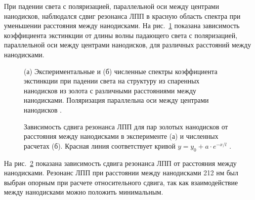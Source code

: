 При падении света с поляризацией, параллельной оси между центрами нанодисков, наблюдался сдвиг резонанса ЛПП в красную область спектра при уменьшении расстояния между нанодисками. На рис.~\ref{img:PR_extinction} показана зависимость коэффициента экстинкции от длины волны падающего света с поляризацией, параллельной оси между центрами нанодисков, для различных расстояний между нанодисками.
\begin{figure}[t]
\caption{(а) Экспериментальные и (б) численные спектры коэффициента экстинкции при падении света на структуру из спаренных нанодисков из золота с различными расстояниями между нанодисками. Поляризация параллельна оси между центрами нанодисков \cite{plasonrulereq}.}
\label{img:PR_extinction}
\end{figure}
\begin{figure}[t]
\caption{Зависимость сдвига резонанса ЛПП для пар золотых нанодисков от расстояния между нанодисками в эксперименте (а) и численных расчетах (б). Красная линия соответствует кривой $ y = y_0 + a \cdot e^{-x/l} $  \cite{plasonrulereq}.}
\label{img:PR_ruler}
\end{figure}

На рис.~\ref{img:PR_ruler} показана зависимость сдвига резонанса ЛПП от расстояния между нанодисками. Резонанс ЛПП при расстоянии между нанодисками 212 нм был выбран опорным при расчете относительного сдвига, так как взаимодействие между нанодисками можно положить минимальным.

